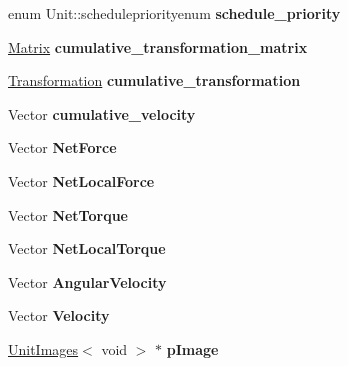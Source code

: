\begin{DoxyCompactItemize}
\item 
enum Unit\+::schedulepriorityenum {\bfseries schedule\+\_\+priority}\hypertarget{classUnit_abb3a59f23968ee14e7758d28f6a539d2}{}\label{classUnit_abb3a59f23968ee14e7758d28f6a539d2}

\item 
\hyperlink{classMatrix}{Matrix} {\bfseries cumulative\+\_\+transformation\+\_\+matrix}\hypertarget{classUnit_ab5da54559fbf718c7d5f082e0ef87b6e}{}\label{classUnit_ab5da54559fbf718c7d5f082e0ef87b6e}

\item 
\hyperlink{structTransformation}{Transformation} {\bfseries cumulative\+\_\+transformation}\hypertarget{classUnit_aad4a20244f77e17cf99587b08f29a0a3}{}\label{classUnit_aad4a20244f77e17cf99587b08f29a0a3}

\item 
Vector {\bfseries cumulative\+\_\+velocity}\hypertarget{classUnit_a59bfdc93caf168329cbee802aebdbcb8}{}\label{classUnit_a59bfdc93caf168329cbee802aebdbcb8}

\item 
Vector {\bfseries Net\+Force}\hypertarget{classUnit_a944d0559064bb1c62c27a68744cc14d9}{}\label{classUnit_a944d0559064bb1c62c27a68744cc14d9}

\item 
Vector {\bfseries Net\+Local\+Force}\hypertarget{classUnit_a777afae39316fcd515cff52723c03de6}{}\label{classUnit_a777afae39316fcd515cff52723c03de6}

\item 
Vector {\bfseries Net\+Torque}\hypertarget{classUnit_a1b540019e3cfd163de602c53441709e9}{}\label{classUnit_a1b540019e3cfd163de602c53441709e9}

\item 
Vector {\bfseries Net\+Local\+Torque}\hypertarget{classUnit_a05e956cbd5573320dac84879e3a8d761}{}\label{classUnit_a05e956cbd5573320dac84879e3a8d761}

\item 
Vector {\bfseries Angular\+Velocity}\hypertarget{classUnit_afc30c05d297c988f6c84b0674079a93e}{}\label{classUnit_afc30c05d297c988f6c84b0674079a93e}

\item 
Vector {\bfseries Velocity}\hypertarget{classUnit_a1e59f902950b0d34f06084bcb5e4ac10}{}\label{classUnit_a1e59f902950b0d34f06084bcb5e4ac10}

\item 
\hyperlink{structUnitImages}{Unit\+Images}$<$ void $>$ $\ast$ {\bfseries p\+Image}\hypertarget{classUnit_a6d169f174197680d69096924225a2eba}{}\label{classUnit_a6d169f174197680d69096924225a2eba}


\end{DoxyCompactItemize}
